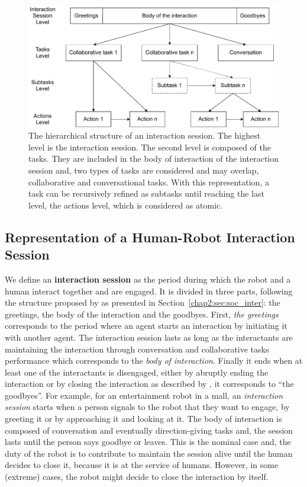 \documentclass[a4paper,11pt,twoside]{StyleThese}
\begin{document}
\begin{figure}[!ht]
	\centering
	\includegraphics[width=\linewidth]{figures/chapter2/session_interaction.pdf}
	\caption{The hierarchical structure of an interaction session. The highest level is the interaction session. The second level is composed of the tasks. They are included in the body of interaction of the interaction session and, two types of tasks are considered and may overlap, collaborative and conversational tasks. With this representation, a task can be recursively refined as subtasks until reaching the last level, the actions level, which is considered as atomic.
		}
	\label{fig:levels}
\end{figure}


\subsection{Representation of a Human-Robot Interaction Session}
We define an \textbf{interaction session} as the period during which the robot and a human interact together and are engaged. It is divided in three parts, following the structure proposed by \cite{robinson_overall_2012} as presented in Section~\ref{chap2:sec:soc_inter}: the greetings, the body of the interaction and the goodbyes. First, \textit{the greetings} corresponds to the period where an agent starts an interaction by initiating it with another agent. The interaction session lasts as long as the interactants are maintaining the interaction through conversation and collaborative tasks performance which corresponds to the \textit{body of interaction}. Finally it ends when at least one of the interactants is disengaged, either by abruptly ending the interaction or by closing the interaction as described by \cite{schegloff_1973_opening}, it corresponds to ``the goodbyes''. For example, for an entertainment robot in a mall, an \textit{interaction session} starts when a person signals to the robot that they want to engage, by greeting it or by approaching it and looking at it. The body of interaction is composed of conversation and eventually direction-giving tasks and, the session lasts until the person says goodbye or leaves. This is the nominal case and, the duty of the robot is to contribute to maintain the session alive until the human decides to close it, because it is at the service of humans. However, in some (extreme) cases, the robot might decide to close the interaction by itself.
\end{document}

